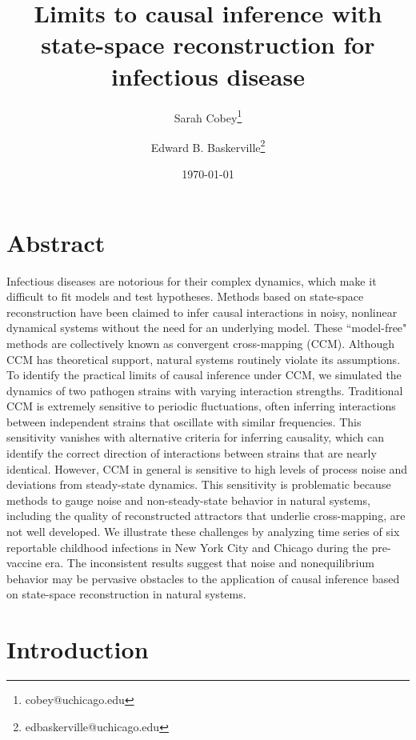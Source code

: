\documentclass[10pt]{article}
\title{Limits to causal inference with state-space reconstruction for infectious disease}
\author[1]{Sarah Cobey\thanks{cobey@uchicago.edu}}
\author[1]{Edward B. Baskerville\thanks{edbaskerville@uchicago.edu}}
\affil[1]{Ecology \& Evolution, University of Chicago, Chicago, IL, USA}
\date{\today}
\begin{document}
\maketitle


\section*{Abstract} 
Infectious diseases are notorious for their complex dynamics, which make it difficult to fit models and test hypotheses.
Methods based on state-space reconstruction have been claimed to infer causal interactions in noisy, nonlinear dynamical systems without the need for an underlying model.
These ``model-free" methods are collectively known as convergent cross-mapping (CCM).
Although CCM has theoretical support, natural systems routinely violate its assumptions.
To identify the practical limits of causal inference under CCM, we simulated the dynamics of two pathogen strains with varying interaction strengths.
Traditional CCM is extremely sensitive to periodic fluctuations, often inferring interactions between independent strains that oscillate with similar frequencies.
This sensitivity vanishes with alternative criteria for inferring causality, which can identify the correct direction of interactions between strains that are nearly identical.
However, CCM in general is sensitive to high levels of process noise and deviations from steady-state dynamics. 
This sensitivity is problematic because methods to gauge noise and non-steady-state behavior in natural systems, including the quality of reconstructed attractors that underlie cross-mapping, are not well developed.
We illustrate these challenges by analyzing time series of six reportable childhood infections in New York City and Chicago during the pre-vaccine era.
The inconsistent results suggest that noise and nonequilibrium behavior may be pervasive obstacles to the application of causal inference based on state-space reconstruction in natural systems.



\section{Introduction}
\end{document}
